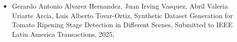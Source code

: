 \begin{itemize} 
\item Gerardo Antonio Alvarez Hernandez, Juan Irving Vasquez, Abril Valeria Uriarte Arcia, Luis Alberto Tovar-Ortiz, Synthetic Dataset Generation for Tomato Ripening Stage Detection in Different Scenes, Submitted to IEEE Latin America Transactions, 2025, \href{https://wwwjivg.org}{\faFilePdfO} 
\end{itemize} 
